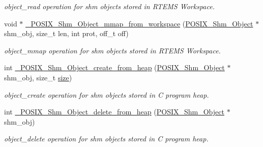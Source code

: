 \begin{DoxyCompactItemize}
\begin{DoxyCompactList}\small\item\em object\+\_\+read operation for shm objects stored in R\+T\+E\+MS Workspace. \end{DoxyCompactList}\item 
\mbox{\label{group__POSIXShmPrivate_ga7117581d3bf30393724eb9c10df4d028}} 
void $\ast$ \mbox{\hyperlink{group__POSIXShmPrivate_ga7117581d3bf30393724eb9c10df4d028}{\+\_\+\+P\+O\+S\+I\+X\+\_\+\+Shm\+\_\+\+Object\+\_\+mmap\+\_\+from\+\_\+workspace}} (\mbox{\hyperlink{structPOSIX__Shm__Object}{P\+O\+S\+I\+X\+\_\+\+Shm\+\_\+\+Object}} $\ast$shm\+\_\+obj, size\+\_\+t len, int prot, off\+\_\+t off)
\begin{DoxyCompactList}\small\item\em object\+\_\+mmap operation for shm objects stored in R\+T\+E\+MS Workspace. \end{DoxyCompactList}\item 
\mbox{\label{group__POSIXShmPrivate_ga90866e7cc721af76b7d25b68f8ab162a}} 
int \mbox{\hyperlink{group__POSIXShmPrivate_ga90866e7cc721af76b7d25b68f8ab162a}{\+\_\+\+P\+O\+S\+I\+X\+\_\+\+Shm\+\_\+\+Object\+\_\+create\+\_\+from\+\_\+heap}} (\mbox{\hyperlink{structPOSIX__Shm__Object}{P\+O\+S\+I\+X\+\_\+\+Shm\+\_\+\+Object}} $\ast$shm\+\_\+obj, size\+\_\+t \mbox{\hyperlink{sun4u_2tte_8h_a245260f6f74972558f61b85227df5aae}{size}})
\begin{DoxyCompactList}\small\item\em object\+\_\+create operation for shm objects stored in C program heap. \end{DoxyCompactList}\item 
\mbox{\label{group__POSIXShmPrivate_gaa4b2f644812b62c4a6c4430eaa4fc9b5}} 
int \mbox{\hyperlink{group__POSIXShmPrivate_gaa4b2f644812b62c4a6c4430eaa4fc9b5}{\+\_\+\+P\+O\+S\+I\+X\+\_\+\+Shm\+\_\+\+Object\+\_\+delete\+\_\+from\+\_\+heap}} (\mbox{\hyperlink{structPOSIX__Shm__Object}{P\+O\+S\+I\+X\+\_\+\+Shm\+\_\+\+Object}} $\ast$shm\+\_\+obj)
\begin{DoxyCompactList}\small\item\em object\+\_\+delete operation for shm objects stored in C program heap. \end{DoxyCompactList}\item 
\mbox{\label{group__POSIXShmPrivate_ga649784e275d805fc2267ee7b53209106}} 

\end{DoxyCompactItemize}
